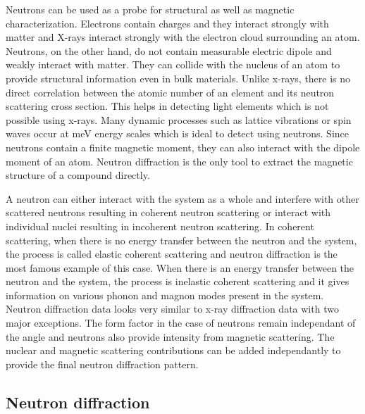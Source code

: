 \documentclass[10pt,doublespacing,edeposit]{uiucthesis2020}
\begin{document}
\begin{mainmatter}
Neutrons can be used as a probe for structural as well as magnetic characterization. Electrons contain charges and they interact strongly with matter and X-rays interact strongly with the electron cloud surrounding an atom. Neutrons, on the other hand, do not contain measurable electric dipole and weakly interact with matter. They can collide with the nucleus of an atom to provide structural information even in bulk materials. Unlike x-rays, there is no direct correlation between the atomic number of an element and its neutron scattering cross section. This helps in detecting light elements which is not possible using x-rays. Many dynamic processes such as lattice vibrations or spin waves occur at meV energy scales which is ideal to detect using neutrons. Since neutrons contain a finite magnetic moment, they can also interact with the dipole moment of an atom. Neutron diffraction is the only tool to extract the magnetic structure of a compound directly.

A neutron can either interact with the system as a whole and interfere with other scattered neutrons resulting in coherent neutron scattering or interact with individual nuclei resulting in incoherent neutron scattering. In coherent scattering, when there is no energy transfer between the neutron and the system, the process is called elastic coherent scattering and neutron diffraction is the most famous example of this case. When there is an energy transfer between the neutron and the system, the process is inelastic coherent scattering and it gives information on various phonon and magnon modes present in the system. Neutron diffraction data looks very similar to x-ray diffraction data with two major exceptions. The form factor in the case of neutrons remain independant of the angle and neutrons also provide intensity from magnetic scattering. The nuclear and magnetic scattering contributions can be added independantly to provide the final neutron diffraction pattern.

\subsection{Neutron diffraction}



\end{mainmatter}
\end{document}
